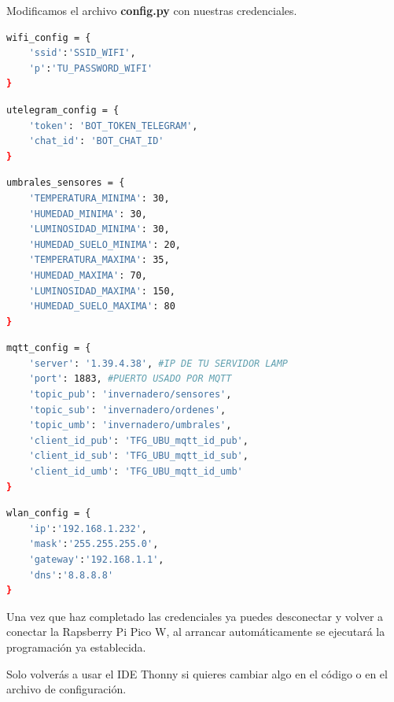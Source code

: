 Modificamos el archivo \textbf{config.py} con nuestras credenciales.

\begin{lstlisting}[language=sh, firstnumber=0, basicstyle=\normalsize, caption={Configurar SSID y clave wifi.}] 
wifi_config = {
    'ssid':'SSID_WIFI',
    'p':'TU_PASSWORD_WIFI'
}\end{lstlisting}



\begin{lstlisting}[language=sh, firstnumber=0, basicstyle=\normalsize, caption={Configución de bot de Telegram.}] 
utelegram_config = {
    'token': 'BOT_TOKEN_TELEGRAM',
    'chat_id': 'BOT_CHAT_ID'
}
\end{lstlisting}

\begin{lstlisting}[language=sh, firstnumber=0, basicstyle=\normalsize, caption={Configuración de umbrales para los sensores.}] 
umbrales_sensores = {
    'TEMPERATURA_MINIMA': 30,
    'HUMEDAD_MINIMA': 30,
    'LUMINOSIDAD_MINIMA': 30,
    'HUMEDAD_SUELO_MINIMA': 20,
    'TEMPERATURA_MAXIMA': 35,
    'HUMEDAD_MAXIMA': 70,
    'LUMINOSIDAD_MAXIMA': 150,
    'HUMEDAD_SUELO_MAXIMA': 80
}
\end{lstlisting}

\begin{lstlisting}[language=sh, firstnumber=0, basicstyle=\normalsize, caption={Configuración MQTT.}] 
mqtt_config = {
    'server': '1.39.4.38', #IP DE TU SERVIDOR LAMP
    'port': 1883, #PUERTO USADO POR MQTT
    'topic_pub': 'invernadero/sensores',
    'topic_sub': 'invernadero/ordenes',
    'topic_umb': 'invernadero/umbrales',
    'client_id_pub': 'TFG_UBU_mqtt_id_pub',
    'client_id_sub': 'TFG_UBU_mqtt_id_sub',
    'client_id_umb': 'TFG_UBU_mqtt_id_umb'
}
\end{lstlisting}

\begin{lstlisting}[language=sh, firstnumber=0, basicstyle=\normalsize, caption={Configuración Wlan para usar ip fija.}] 
wlan_config = {
    'ip':'192.168.1.232',
    'mask':'255.255.255.0',
    'gateway':'192.168.1.1',
    'dns':'8.8.8.8' 
}
\end{lstlisting}

Una vez que haz completado las credenciales ya puedes desconectar y volver a conectar la Rapsberry Pi Pico W, al arrancar automáticamente se ejecutará la programación ya establecida.

Solo volverás a usar el IDE Thonny si quieres cambiar algo en el código o en el archivo de configuración.

